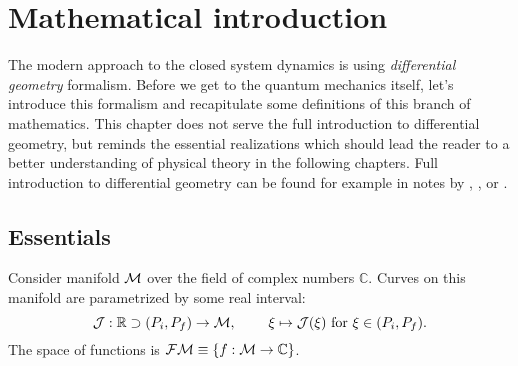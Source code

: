 \chapter{Mathematical introduction}
\label{chap:mathIntro}
The modern approach to the closed system dynamics is using \emph{differential geometry} formalism. Before we get to the quantum mechanics itself, let's introduce this formalism and recapitulate some definitions of this branch of mathematics. This chapter does not serve the full introduction to differential geometry, but reminds the essential realizations which should lead the reader to a better understanding of physical theory in the following chapters. Full introduction to differential geometry can be found for example in notes by \citet{krtous}, \citet{lu}, or \citet{fecko}. 
\section{Essentials}
Consider manifold $\mathcal{M}$ over the field of complex numbers $\mathbb C$. Curves on this manifold are parametrized by some real interval:
$$\mathcal J:\mathbb{R} \supset (P_i,P_f) \rightarrow \mathcal{M},\; \qquad \xi\mapsto \mathcal J(\xi) \text{  for } \xi \in (P_i,P_f) .$$ 
The space of functions is $\mathcal{FM}\equiv\{f:\mathcal{M}\rightarrow \mathbb{C}\}$.


